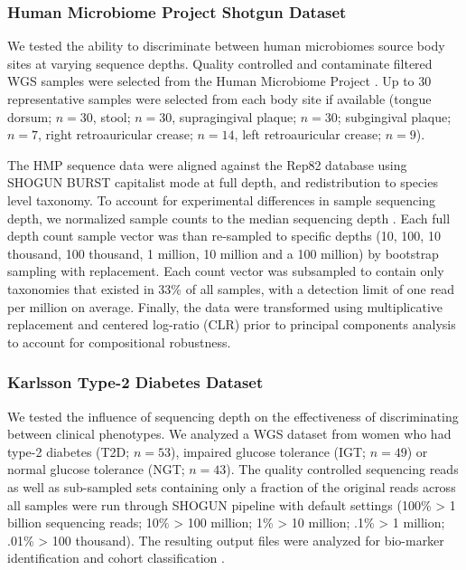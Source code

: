 \subsubsection{Human Microbiome Project Shotgun Dataset}

We tested the ability to discriminate between human microbiomes source body sites at varying sequence depths. Quality controlled and contaminate filtered WGS samples were selected from the Human Microbiome Project \cite{consortium_structure_2012}. Up to 30 representative samples were selected from each body site if available (tongue dorsum; $n = 30$, stool; $n = 30$, supragingival plaque; $n = 30$; subgingival plaque; $n = 7$, right retroauricular crease; $n=14$, left retroauricular crease; $n = 9$).

The HMP sequence data were aligned against the Rep82 database using SHOGUN BURST capitalist mode at full depth, and redistribution to species level taxonomy. To account for experimental differences in sample sequencing depth, we normalized sample counts to the median sequencing depth \cite{mcmurdie_waste_2014}. Each full depth count sample vector was than re-sampled to specific depths (10, 100, 10 thousand, 100 thousand, 1 million, 10 million and a 100 million) by bootstrap sampling with replacement. Each count vector was subsampled to contain only taxonomies that existed in 33\% of all samples, with a detection limit of one read per million on average. Finally, the data were transformed using multiplicative replacement and centered log-ratio (CLR) \cite{martin-fernandez_dealing_2003} prior to principal components analysis \cite{wold_principal_1987} to account for compositional robustness.

\subsubsection{Karlsson Type-2 Diabetes Dataset}

We tested the influence of sequencing depth on the effectiveness of discriminating between clinical phenotypes. We analyzed a WGS dataset from women who had type-2 diabetes (T2D; $n=53$), impaired glucose tolerance (IGT; $n=49$) or normal glucose tolerance (NGT; $n=43$). The quality controlled sequencing reads as well as sub-sampled sets containing only a fraction of the original reads across all samples were run through SHOGUN pipeline with default settings (100\% > 1 billion sequencing reads; 10\% > 100 million; 1\% > 10 million; .1\% > 1 million; .01\% > 100 thousand). The resulting output files were analyzed for bio-marker identification and cohort classification \cite{karlsson_gut_2013}.

